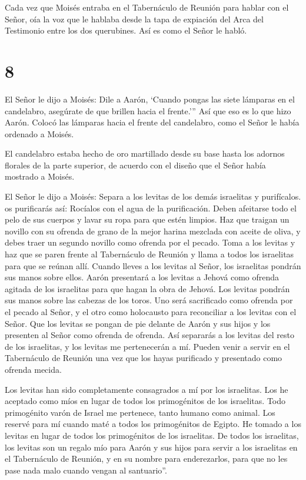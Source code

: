  Cada vez que Moisés entraba en el Tabernáculo de Reunión
para hablar con el Señor, oía la voz que le hablaba desde la tapa de
expiación del Arca del Testimonio entre los dos querubines. Así es como
el Señor le habló.

\hypertarget{section-7}{%
\section{8}\label{section-7}}

 El Señor le dijo a Moisés:  Dile a Aarón,
`Cuando pongas las siete lámparas en el candelabro, asegúrate de que
brillen hacia el frente.'''  Así que eso es lo que hizo
Aarón. Colocó las lámparas hacia el frente del candelabro, como el Señor
le había ordenado a Moisés.

 El candelabro estaba hecho de oro martillado desde su base
hasta los adornos florales de la parte superior, de acuerdo con el
diseño que el Señor había mostrado a Moisés.

 El Señor le dijo a Moisés:  Separa a los
levitas de los demás israelitas y purifícalos.  os
purificarás así: Rocíalos con el agua de la purificación. Deben
afeitarse todo el pelo de sus cuerpos y lavar su ropa para que estén
limpios.  Haz que traigan un novillo con su ofrenda de grano
de la mejor harina mezclada con aceite de oliva, y debes traer un
segundo novillo como ofrenda por el pecado.  Toma a los
levitas y haz que se paren frente al Tabernáculo de Reunión y llama a
todos los israelitas para que se reúnan allí.  Cuando
lleves a los levitas al Señor, los israelitas pondrán sus manos sobre
ellos.  Aarón presentará a los levitas a Jehová como
ofrenda agitada de los israelitas para que hagan la obra de Jehová.
 Los levitas pondrán sus manos sobre las cabezas de los
toros. Uno será sacrificado como ofrenda por el pecado al Señor, y el
otro como holocausto para reconciliar a los levitas con el Señor.
 Que los levitas se pongan de pie delante de Aarón y sus
hijos y los presenten al Señor como ofrenda de ofrenda. 
Así separarás a los levitas del resto de los israelitas, y los levitas
me pertenecerán a mí.  Pueden venir a servir en el
Tabernáculo de Reunión una vez que los hayas purificado y presentado
como ofrenda mecida.

 Los levitas han sido completamente consagrados a mí por
los israelitas. Los he aceptado como míos en lugar de todos los
primogénitos de los israelitas.  Todo primogénito varón de
Israel me pertenece, tanto humano como animal. Los reservé para mí
cuando maté a todos los primogénitos de Egipto.  He tomado
a los levitas en lugar de todos los primogénitos de los israelitas.
 De todos los israelitas, los levitas son un regalo mío
para Aarón y sus hijos para servir a los israelitas en el Tabernáculo de
Reunión, y en su nombre para enderezarlos, para que no les pase nada
malo cuando vengan al santuario''.

